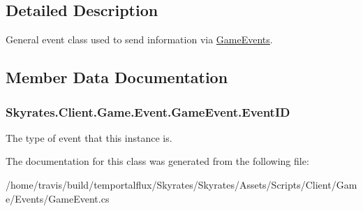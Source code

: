\subsection{Detailed Description}
General event class used to send information via \hyperlink{class_skyrates_1_1_client_1_1_game_1_1_event_1_1_game_events}{Game\-Events}. 



\subsection{Member Data Documentation}
\hypertarget{class_skyrates_1_1_client_1_1_game_1_1_event_1_1_game_event_a193001c33b9858618141589ca39723b3}{
\subsubsection[{Event\-I\-D}]{ Skyrates.\-Client.\-Game.\-Event.\-Game\-Event.\-Event\-I\-D}}\label{class_skyrates_1_1_client_1_1_game_1_1_event_1_1_game_event_a193001c33b9858618141589ca39723b3}


The type of event that this instance is. 



The documentation for this class was generated from the following file\-:\begin{DoxyCompactItemize}
\item 
/home/travis/build/temportalflux/\-Skyrates/\-Skyrates/\-Assets/\-Scripts/\-Client/\-Game/\-Events/Game\-Event.\-cs\end{DoxyCompactItemize}
